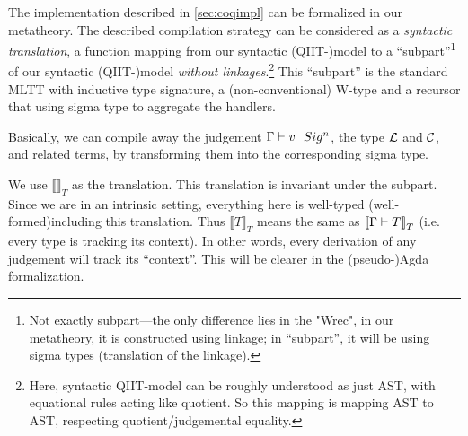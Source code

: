 The implementation described in \cref{sec:coqimpl} can be formalized in
our metatheory. The described compilation strategy can be considered as
a \textit{syntactic translation}, a function mapping from our syntactic
(QIIT-)model to a ``subpart''\footnote{Not exactly subpart---the only
difference lies in the "Wrec", in our metatheory, it is constructed
using linkage; in ``subpart'', it will be using sigma types (translation
of the linkage).} of our syntactic (QIIT-)model \textit{without
linkages}.\footnote{Here, syntactic QIIT-model can be roughly understood
as just AST, with equational rules acting like quotient. So this mapping
is mapping AST to AST, respecting quotient/judgemental equality.} This
``subpart'' is the standard MLTT with inductive type signature, a
(non-conventional) W-type and a recursor that using sigma type to
aggregate the handlers. 

Basically, we can compile away the judgement ${ {\Gamma} \vdash {v} \ \ Sig^{n} }$,
the type ${\mathcal{L}}$ and ${\mathcal{C}}$, and related terms, by transforming them into
the corresponding sigma type.

 

\newcommand{\denotesT}[1]{{{\llbracket {#1} \rrbracket}_T}}
\newcommand{\Sigr}[2]{{ "Sig"^r~{#1}~{#2} }}

We use $\denotesT{}$ as the translation. This translation is invariant
under the subpart. Since we are in an intrinsic setting, everything here
is well-typed (well-formed)including this translation. Thus
$\denotesT{T}$ means the same as $\denotesT{\goodType{\Gamma}{T}{}}$
(i.e. every type is tracking its context). In other words, every
derivation of any judgement will track its ``context''. This will be
clearer in the (pseudo-)Agda formalization.

